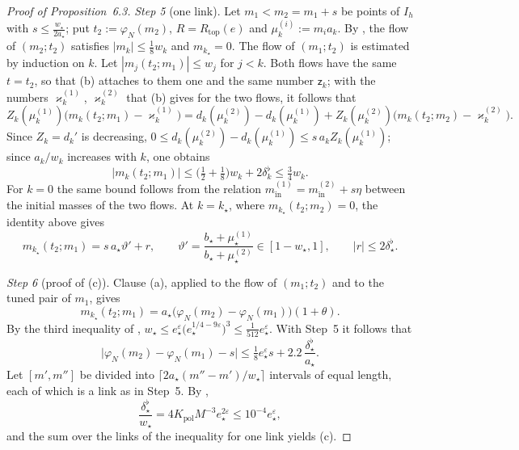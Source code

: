 \documentclass[11pt,letterpaper,reqno]{amsart}
\theoremstyle{definition}
\begin{document}
\begin{proof}[Proof of Proposition~6.3]
\emph{Step 5} (one link).
Let $m_1<m_2=m_1+s$ be points of $I_h$ with $s\le\frac{w_\star}{2a_\star}$;
put $t_2:=\varphi_N(m_2)$, $R=R_{\mathrm{top}}(e)$ and $\mu_k^{(i)}:=m_ia_k$.
By \cite[Proposition~28.2]{QEDIII}, the flow of $(m_2;t_2)$ satisfies $|m_k|\le\frac18w_k$ and $m_{k_\star}=0$.
The flow of $(m_1;t_2)$ is estimated by induction on $k$.
Let $|m_j(t_2;m_1)|\le w_j$ for $j<k$.
Both flows have the same $t=t_2$, so that (b) attaches to them one and the same number $\mathsf z_k$;
with the numbers $\varkappa_k^{(1)}$, $\varkappa_k^{(2)}$ that (b) gives for the two flows, it follows that
\begin{equation*}
Z_k(\mu_k^{(1)})\bigl(m_k(t_2;m_1)-\varkappa_k^{(1)}\bigr)=d_k(\mu_k^{(2)})-d_k(\mu_k^{(1)})+Z_k(\mu_k^{(2)})\bigl(m_k(t_2;m_2)-\varkappa_k^{(2)}\bigr).
\end{equation*}
Since $Z_k=d_k'$ is decreasing, $0\le d_k(\mu_k^{(2)})-d_k(\mu_k^{(1)})\le s\,a_kZ_k(\mu_k^{(1)})$;
since $a_k/w_k$ increases with $k$, one obtains
\begin{equation*}
|m_k(t_2;m_1)|\le\bigl(\tfrac12+\tfrac18\bigr)w_k+2\delta_k^\flat\le\tfrac34w_k .
\end{equation*}
For $k=0$ the same bound follows from the relation $m^{(1)}_{\mathrm{in}}=m^{(2)}_{\mathrm{in}}+s\eta$ between the initial masses of the two flows.
At $k=k_\star$, where $m_{k_\star}(t_2;m_2)=0$, the identity above gives
\begin{equation*}
m_{k_\star}(t_2;m_1)=s\,a_\star\vartheta'+r,\qquad\vartheta'=\frac{b_\star+\mu_\star^{(1)}}{b_\star+\mu_\star^{(2)}}\in[1-w_\star,1],\qquad|r|\le2\delta^\flat_\star .
\end{equation*}

\emph{Step 6} (proof of (c)).
Clause (a), applied to the flow of $(m_1;t_2)$ and to the tuned pair of $m_1$, gives
\begin{equation*}
m_{k_\star}(t_2;m_1)=a_\star\bigl(\varphi_N(m_2)-\varphi_N(m_1)\bigr)(1+\theta).
\end{equation*}
By the third inequality of \cite[(T2)]{QEDIII}, $w_\star\le e_\star^{\varepsilon}\bigl(e_\star^{1/4-9\varepsilon}\bigr)^3\le\frac1{512}e_\star^{\varepsilon}$.
With Step~5 it follows that
\begin{equation*}
\bigl|\varphi_N(m_2)-\varphi_N(m_1)-s\bigr|\le\tfrac18e_\star^{\varepsilon}s+2.2\,\frac{\delta^\flat_\star}{a_\star}.
\end{equation*}
Let $[m',m'']$ be divided into $\lceil2a_\star(m''-m')/w_\star\rceil$ intervals of equal length, each of which is a link as in Step~5.
By \cite[(fl)]{QEDIII},
\begin{equation*}
\frac{\delta^\flat_\star}{w_\star}=4K_{\mathrm{pol}}M^{-3}e_\star^{2\varepsilon}\le10^{-4}e_\star^{\varepsilon},
\end{equation*}
and the sum over the links of the inequality for one link yields (c).


\end{proof}
\end{document}
